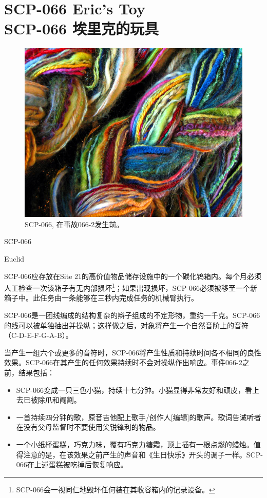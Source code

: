 \chapter[SCP-066 埃里克的玩具]{
    SCP-066 Eric's Toy\\
    SCP-066 埃里克的玩具
}

\label{chap:SCP-066}

\begin{figure}[H]
    \centering
    \includegraphics[width=0.5\linewidth]{images/SCP-066.jpg}
    \caption*{SCP-066, 在事故066-2发生前。}
\end{figure}

SCP-066

 Euclid


SCP-066应存放在Site 21的高价值物品储存设施中的一个碳化钨箱内。每个月必须人工检查一次该箱子有无内部损坏\footnote{SCP-066会一视同仁地毁坏任何装在其收容箱内的记录设备。}；如果出现损坏，SCP-066必须被移至一个新箱子中。此任务由一条能够在三秒内完成任务的机械臂执行。

SCP-066是一团线编成的结构复杂的辫子组成的不定形物，重约一千克。SCP-066的线可以被单独抽出并操纵；这样做之后，对象将产生一个自然音阶上的音符（C-D-E-F-G-A-B）。

当产生一组六个或更多的音符时，SCP-066将产生性质和持续时间各不相同的良性效果。SCP-066在其产生的任何效果持续时不会对操纵作出响应。事件066-2之前，结果包括：

\begin{itemize}
\item SCP-066变成一只三色小猫，持续十七分钟。小猫显得非常友好和顽皮，看上去已被除爪和阉割。
\item 一首持续四分钟的歌，原音吉他配上歌手\slash 创作人{[}编辑]的歌声。歌词告诫听者在没有父母监督时不要使用尖锐锋利的物品。
\item 一个小纸杯蛋糕，巧克力味，覆有巧克力糖霜，顶上插有一根点燃的蜡烛。值得注意的是，在该效果之前产生的声音和《生日快乐》开头的调子一样。SCP-066在上述蛋糕被吃掉后恢复响应。
\end{itemize}

